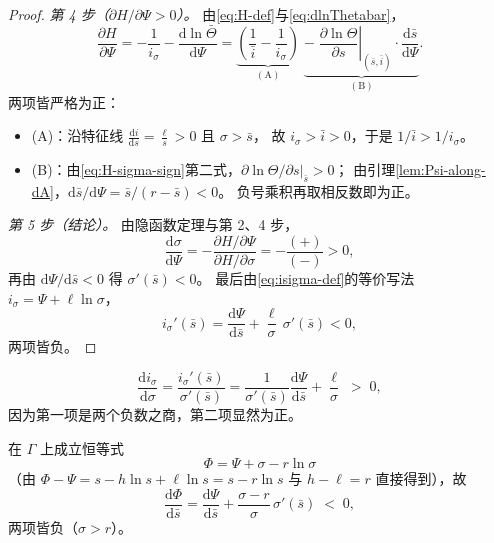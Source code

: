 \begin{proof}
\emph{第 4 步（$\partial H/\partial\Psi>0$）。}
由\eqref{eq:H-def}与\eqref{eq:dlnThetabar}，
\begin{equation}
  \frac{\partial H}{\partial\Psi}
  =-\frac{1}{i_\sigma}-\frac{\mathrm{d}\ln\bar\Theta}{\mathrm{d}\Psi}
  =\underbrace{\left(\frac{1}{\bar i}-\frac{1}{i_\sigma}\right)}_{(\mathrm{A})}
  \;\underbrace{-\;
   \left.\frac{\partial\ln\Theta}{\partial s}\right|_{(\bar s,\bar i)}
   \cdot\frac{\mathrm{d}\bar s}{\mathrm{d}\Psi}}_{(\mathrm{B})}.
  \label{eq:H-Psi}
\end{equation}
两项皆严格为正：
\begin{itemize}
\item (A)：沿特征线 $\frac{\mathrm{d}i}{\mathrm{d}s}=\frac{\ell}{s}>0$ 且 $\sigma>\bar s$，
      故 $i_\sigma>\bar i>0$，于是 $1/\bar i>1/i_\sigma$。
\item (B)：由\eqref{eq:H-sigma-sign}第二式，$\partial\ln\Theta/\partial s|_{\bar s}>0$；
      由引理\ref{lem:Psi-along-dA}，$\mathrm{d}\bar s/\mathrm{d}\Psi=\bar s/(r-\bar s)<0$。
      负号乘积再取相反数即为正。
\end{itemize}

\emph{第 5 步（结论）。} 由隐函数定理与第 2、4 步，
\[
  \frac{\mathrm{d}\sigma}{\mathrm{d}\Psi}
  =-\frac{\partial H/\partial\Psi}{\partial H/\partial\sigma}
  =-\frac{(+)}{(-)}>0 ,
\]
再由 $\mathrm{d}\Psi/\mathrm{d}\bar s<0$ 得 $\sigma'(\bar s)<0$。
最后由\eqref{eq:isigma-def}的等价写法 $i_\sigma=\Psi+\ell\ln\sigma$，
\begin{equation}
  i_\sigma'(\bar s)=\frac{\mathrm{d}\Psi}{\mathrm{d}\bar s}
  +\frac{\ell}{\sigma}\,\sigma'(\bar s)<0 ,
  \label{eq:isigma-prime}
\end{equation}
两项皆负。
\end{proof}

\begin{corollary}
\label{cor:Gamma-increasing-slope}
\begin{equation}
  \frac{\mathrm{d}i_\sigma}{\mathrm{d}\sigma}
  =\frac{i_\sigma'(\bar s)}{\sigma'(\bar s)}
  =\frac{1}{\sigma'(\bar s)}\frac{\mathrm{d}\Psi}{\mathrm{d}\bar s}+\frac{\ell}{\sigma}
  \;>\;0 ,
  \label{eq:Gamma-slope}
\end{equation}
因为第一项是两个负数之商，第二项显然为正。
\end{corollary}

\begin{corollary}
\label{cor:Phi-decreasing}
在 $\Gamma$ 上成立恒等式
\begin{equation}
  \Phi=\Psi+\sigma-r\ln\sigma
  \label{eq:Phi-Psi-identity}
\end{equation}
（由 $\Phi-\Psi=s-h\ln s+\ell\ln s=s-r\ln s$ 与 $h-\ell=r$ 直接得到），故
\begin{equation}
  \frac{\mathrm{d}\Phi}{\mathrm{d}\bar s}
  =\frac{\mathrm{d}\Psi}{\mathrm{d}\bar s}
  +\frac{\sigma-r}{\sigma}\,\sigma'(\bar s)\;<\;0 ,
  \label{eq:dPhi-dsbar-clean}
\end{equation}
两项皆负（$\sigma>r$）。
\end{corollary}

